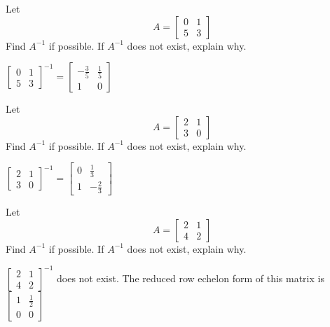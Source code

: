 \documentclass{ximera}
\begin{document}
\begin{problem}\label{prb:4.36}Let
\begin{equation*}
A=\left[
\begin{array}{rr}
0 & 1 \\
5 & 3
\end{array}
\right]
\end{equation*}
Find $A^{-1}$ if possible. If $A^{-1}$ does not exist, explain why.
\begin{hint}
$\left[
\begin{array}{cc}
0 & 1 \\
5 & 3
\end{array}
\right]^{-1}= \left[
\begin{array}{cc}
- \frac{3}{5} &  \frac{1}{5} \\
1 & 0
\end{array}
\right]$
\end{hint}
\end{problem}

\begin{problem}\label{prb:4.37}Let
\begin{equation*}
A=\left[
\begin{array}{rr}
2 & 1 \\
3 & 0
\end{array}
\right]
\end{equation*}
Find $A^{-1}$ if possible. If $A^{-1}$ does not exist, explain why.
\begin{hint}
$\left[
\begin{array}{cc}
2 & 1 \\
3 & 0
\end{array}
\right]^{-1}= \left[
\begin{array}{cc}
0 &  \frac{1}{3} \\
1 & - \frac{2}{3}
\end{array}
\right]$
\end{hint}
\end{problem}

\begin{problem}\label{prb:4.38}Let
\begin{equation*}
A=\left[
\begin{array}{rr}
2 & 1 \\
4 & 2
\end{array}
\right]
\end{equation*}
Find $A^{-1}$ if possible. If $A^{-1}$ does not exist, explain why.
\begin{hint}
$\left[
\begin{array}{cc}
2 & 1 \\
4 & 2
\end{array}
\right]^{-1}$ does not exist. The reduced row echelon form of this matrix
is $\left[
\begin{array}{cc}
1 &  \frac{1}{2} \\
0 & 0
\end{array}
\right]$
\end{hint}
\end{problem}
\end{document}
